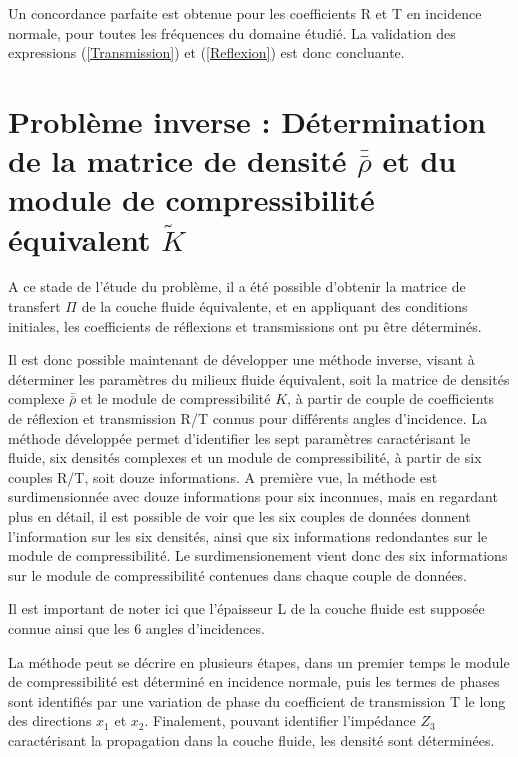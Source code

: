 \documentclass[twoside,openright]{report}
\begin{document}
    Un concordance parfaite est obtenue pour les coefficients R et T en incidence normale, pour toutes les fréquences du domaine étudié. La validation des expressions (\ref{Transmission}) et (\ref{Reflexion}) est donc concluante. 

\chapter{Problème inverse : Détermination de la matrice de densité $\bar{\bar{\rho}}$ et du module de compressibilité équivalent $\tilde{K}$}
\label{Ch_Inv}
	A ce stade de l'étude du problème, il a été possible d'obtenir la matrice de transfert $\Pi$ de la couche fluide équivalente, et en appliquant des conditions initiales, les coefficients de réflexions et transmissions ont pu être déterminés.
	
	Il est donc possible maintenant de développer une méthode inverse, visant à déterminer les paramètres du milieux fluide équivalent, soit la matrice de densités complexe $\bar{\bar{\rho}}$ et le module de compressibilité $K$, à partir de couple de coefficients de réflexion et transmission R/T connus pour différents angles d'incidence.
	La méthode développée permet d'identifier les sept paramètres caractérisant le fluide, six densités complexes et un module de compressibilité, à partir de six couples R/T, soit douze informations. A première vue, la méthode est surdimensionnée avec douze informations pour six inconnues, mais en regardant plus en détail, il est possible de voir que les six couples de données donnent l'information sur les six densités, ainsi que six informations redondantes sur le module de compressibilité. Le surdimensionement vient donc des six informations sur le module de compressibilité contenues dans chaque couple de données. 
    
    Il est important de noter ici que l'épaisseur L de la couche fluide est supposée connue ainsi que les 6 angles d'incidences.
    
    La méthode peut se décrire en plusieurs étapes, dans un premier temps le module de compressibilité est déterminé en incidence normale, puis les termes de phases sont identifiés par une variation de phase du coefficient de transmission T le long des directions $x_1$ et $x_2$. Finalement, pouvant identifier l'impédance $Z_3$ caractérisant la propagation dans la couche fluide, les densité sont déterminées.
    
\end{document}
